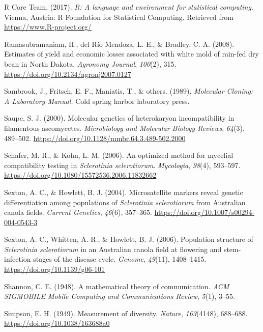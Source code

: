 \documentclass[fleqn,10pt,lineno]{wlpeerj} %
\theoremstyle{definition}
\theoremstyle{definition}
\theoremstyle{definition}
\theoremstyle{remark}
\begin{document}
\hypertarget{ref-R}{}
R Core Team. (2017). \emph{R: A language and environment for statistical
computing}. Vienna, Austria: R Foundation for Statistical Computing.
Retrieved from \url{https://www.R-project.org/}

\hypertarget{ref-ramasubramaniam2008estimates}{}
Ramasubramaniam, H., del Río Mendoza, L. E., \& Bradley, C. A. (2008).
Estimates of yield and economic losses associated with white mold of
rain-fed dry bean in North Dakota. \emph{Agronomy Journal},
\emph{100}(2), 315. \url{https://doi.org/10.2134/agronj2007.0127}

\hypertarget{ref-sambrook1989molecular}{}
Sambrook, J., Fritsch, E. F., Maniatis, T., \& others. (1989).
\emph{Molecular Cloning: A Laboratory Manual.} Cold spring harbor
laboratory press.

\hypertarget{ref-saupe2000molecular}{}
Saupe, S. J. (2000). Molecular genetics of heterokaryon incompatibility
in filamentous ascomycetes. \emph{Microbiology and Molecular Biology
Reviews}, \emph{64}(3), 489--502.
\url{https://doi.org/10.1128/mmbr.64.3.489-502.2000}

\hypertarget{ref-schafer2006optimized}{}
Schafer, M. R., \& Kohn, L. M. (2006). An optimized method for mycelial
compatibility testing in \emph{Sclerotinia sclerotiorum}.
\emph{Mycologia}, \emph{98}(4), 593--597.
\url{https://doi.org/10.1080/15572536.2006.11832662}

\hypertarget{ref-sexton2004microsatellite}{}
Sexton, A. C., \& Howlett, B. J. (2004). Microsatellite markers reveal
genetic differentiation among populations of \emph{Sclerotinia
sclerotiorum} from Australian canola fields. \emph{Current Genetics},
\emph{46}(6), 357--365. \url{https://doi.org/10.1007/s00294-004-0543-3}

\hypertarget{ref-sexton2006population}{}
Sexton, A. C., Whitten, A. R., \& Howlett, B. J. (2006). Population
structure of \emph{Sclerotinia sclerotiorum} in an Australian canola
field at flowering and stem-infection stages of the disease cycle.
\emph{Genome}, \emph{49}(11), 1408--1415.
\url{https://doi.org/10.1139/g06-101}

\hypertarget{ref-shannon2001mathematical}{}
Shannon, C. E. (1948). A mathematical theory of communication. \emph{ACM
SIGMOBILE Mobile Computing and Communications Review}, \emph{5}(1),
3--55.

\hypertarget{ref-simpson1949measurement}{}
Simpson, E. H. (1949). Measurement of diversity. \emph{Nature},
\emph{163}(4148), 688--688. \url{https://doi.org/10.1038/163688a0}
\end{document}
